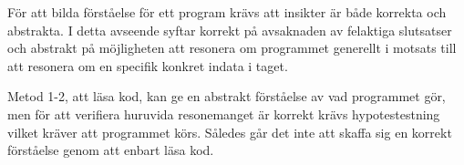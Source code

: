 


För att bilda förståelse för ett program krävs att insikter är både korrekta %
och abstrakta. I detta avseende syftar korrekt på avsaknaden av felaktiga slutsatser
och abstrakt på möjligheten att resonera om programmet generellt i
motsats till att resonera om en specifik konkret indata i taget.

Metod 1-2, att läsa kod, kan ge en abstrakt förståelse av vad
programmet gör, men för att verifiera huruvida resonemanget är korrekt krävs
hypotestestning vilket kräver att programmet körs. Således går det inte att
skaffa sig en korrekt förståelse genom att enbart läsa kod.

